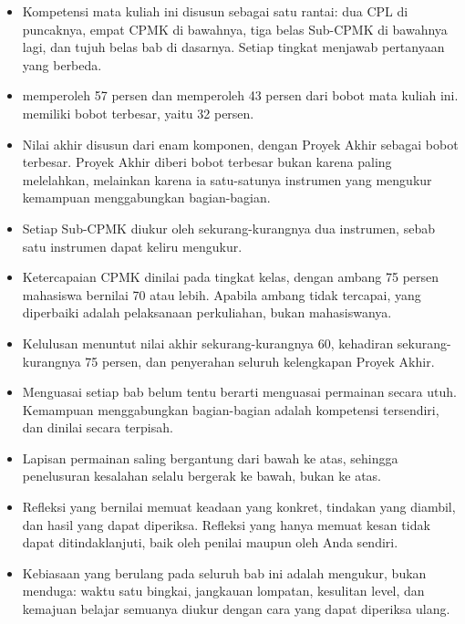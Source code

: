 
\begin{rangkumanbox}
\begin{itemize}
  \item Kompetensi mata kuliah ini disusun sebagai satu rantai: dua CPL di
        puncaknya, empat CPMK di bawahnya, tiga belas Sub-CPMK di bawahnya
        lagi, dan tujuh belas bab di dasarnya. Setiap tingkat menjawab
        pertanyaan yang berbeda.
  \item {} memperoleh 57 persen dan  memperoleh 43 persen dari
        bobot mata kuliah ini.  memiliki bobot terbesar, yaitu 32
        persen.
  \item Nilai akhir disusun dari enam komponen, dengan Proyek Akhir sebagai
        bobot terbesar. Proyek Akhir diberi bobot terbesar bukan karena paling
        melelahkan, melainkan karena ia satu-satunya instrumen yang mengukur
        kemampuan menggabungkan bagian-bagian.
  \item Setiap Sub-CPMK diukur oleh sekurang-kurangnya dua instrumen, sebab
        satu instrumen dapat keliru mengukur.
  \item Ketercapaian CPMK dinilai pada tingkat kelas, dengan ambang 75 persen
        mahasiswa bernilai 70 atau lebih. Apabila ambang tidak tercapai, yang
        diperbaiki adalah pelaksanaan perkuliahan, bukan mahasiswanya.
  \item Kelulusan menuntut nilai akhir sekurang-kurangnya 60, kehadiran
        sekurang-kurangnya 75 persen, dan penyerahan seluruh kelengkapan
        Proyek Akhir.
  \item Menguasai setiap bab belum tentu berarti menguasai permainan secara
        utuh. Kemampuan menggabungkan bagian-bagian adalah kompetensi
        tersendiri, dan dinilai secara terpisah.
  \item Lapisan permainan saling bergantung dari bawah ke atas, sehingga
        penelusuran kesalahan selalu bergerak ke bawah, bukan ke atas.
  \item Refleksi yang bernilai memuat keadaan yang konkret, tindakan yang
        diambil, dan hasil yang dapat diperiksa. Refleksi yang hanya memuat
        kesan tidak dapat ditindaklanjuti, baik oleh penilai maupun oleh Anda
        sendiri.
  \item Kebiasaan yang berulang pada seluruh bab ini adalah mengukur, bukan
        menduga: waktu satu bingkai, jangkauan lompatan, kesulitan level, dan
        kemajuan belajar semuanya diukur dengan cara yang dapat diperiksa
        ulang.
\end{itemize}
\end{rangkumanbox}
